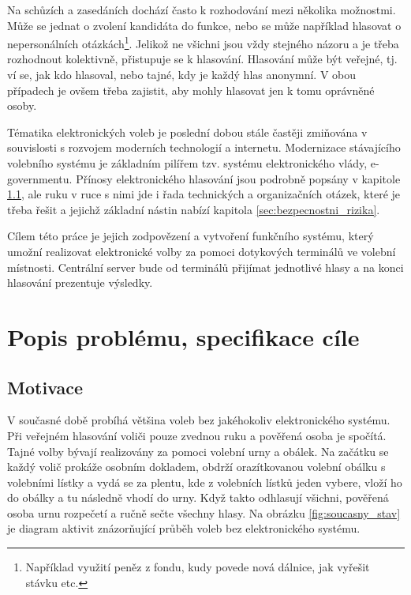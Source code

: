 \documentclass[11pt,twoside,a4paper]{book}
\begin{document}
Na schůzích a zasedáních dochází často k rozhodování mezi několika možnostmi. Může se jednat o zvolení kandidáta do funkce, nebo se může například hlasovat o nepersonálních otázkách\footnote{Například využití peněz z fondu, kudy povede nová dálnice, jak vyřešit stávku etc.}. Jelikož ne všichni jsou vždy stejného názoru a je třeba rozhodnout kolektivně, přistupuje se k hlasování. Hlasování může být veřejné, tj. ví se, jak kdo hlasoval, nebo tajné, kdy je každý hlas anonymní. V obou případech je ovšem třeba zajistit, aby mohly hlasovat jen k tomu oprávněné osoby.

Tématika elektronických voleb je poslední dobou stále častěji zmiňována v souvislosti s rozvojem moderních technologií a internetu. Modernizace stávajícího volebního systému je základním pilířem tzv. systému elektronického vlády, e-governmentu. Přínosy elektronického hlasování jsou podrobně popsány v kapitole \ref{sec:motivace}, ale ruku v ruce s nimi jde i řada technických a organizačních otázek, které je třeba řešit a jejichž základní nástin nabízí kapitola \ref{sec:bezpecnostni_rizika}.

Cílem této práce je jejich zodpovězení a vytvoření funkčního systému, který umožní realizovat elektronické volby za pomoci dotykových terminálů ve volební místnosti. Centrální server bude od terminálů přijímat jednotlivé hlasy a na konci hlasování prezentuje výsledky.


\chapter{Popis problému, specifikace cíle}

\section{Motivace} \label{sec:motivace}

V současné době probíhá většina voleb bez jakéhokoliv elektronického systému. Při veřejném hlasování voliči pouze zvednou ruku a pověřená osoba je spočítá. Tajné volby bývají realizovány za pomoci volební urny a obálek. Na začátku se každý volič prokáže osobním dokladem, obdrží orazítkovanou volební obálku s volebními lístky a vydá se za plentu, kde z volebních lístků jeden vybere, vloží ho do obálky a tu následně vhodí do urny. Když takto odhlasují všichni, pověřená osoba urnu rozpečetí a ručně sečte všechny hlasy. Na obrázku \ref{fig:soucasny_stav} je diagram aktivit znázorňující průběh voleb bez elektronického systému.
\end{document}
